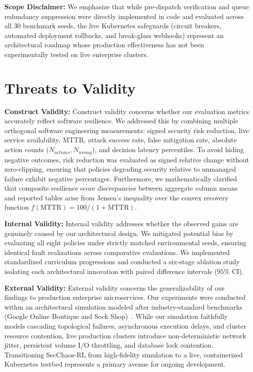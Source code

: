 \documentclass[11pt,a4paper]{article}
\begin{document}
\textbf{Scope Disclaimer:} We emphasize that while pre-dispatch verification and queue redundancy suppression were directly implemented in code and evaluated across all 30 benchmark seeds, the live Kubernetes safeguards (circuit breakers, automated deployment rollbacks, and break-glass webhooks) represent an architectural roadmap whose production effectiveness has not been experimentally tested on live enterprise clusters.

\section{Threats to Validity}
\label{sec:validity}

\textbf{Construct Validity:} Construct validity concerns whether our evaluation metrics accurately reflect software resilience. We addressed this by combining multiple orthogonal software engineering measurements: signed security risk reduction, live service availability, MTTR, attack success rate, false mitigation rate, absolute action counts ($N_{actions}, N_{wrong}$), and decision latency percentiles. To avoid hiding negative outcomes, risk reduction was evaluated as signed relative change without zero-clipping, ensuring that policies degrading security relative to unmanaged failure exhibit negative percentages. Furthermore, we mathematically clarified that composite resilience score discrepancies between aggregate column means and reported tables arise from Jensen's inequality over the convex recovery function $f(\text{MTTR}) = 100 / (1 + \text{MTTR})$.

\textbf{Internal Validity:} Internal validity addresses whether the observed gains are genuinely caused by our architectural design. We mitigated potential bias by evaluating all eight policies under strictly matched environmental seeds, ensuring identical fault realizations across comparative evaluations. We implemented standardized curriculum progressions and conducted a six-stage ablation study isolating each architectural innovation with paired difference intervals ($95\%$ CI).

\textbf{External Validity:} External validity concerns the generalizability of our findings to production enterprise microservices. Our experiments were conducted within an architectural simulation modeled after industry-standard benchmarks (Google Online Boutique and Sock Shop)~\cite{aderaldo2025declarative, soldani2023microservice}. While our simulation faithfully models cascading topological failures, asynchronous execution delays, and cluster resource contention, live production clusters introduce non-deterministic network jitter, persistent volume I/O throttling, and database lock contention. Transitioning SecChaos-RL from high-fidelity simulation to a live, containerized Kubernetes testbed represents a primary avenue for ongoing development.
\end{document}
